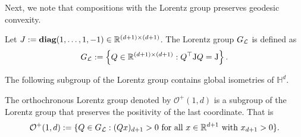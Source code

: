 \documentclass[twoside,11pt]{article}
\begin{document}
Next, we note that compositions with the Lorentz group preserves geodesic convexity.


\begin{definition}
Let $J := \textbf{diag}(1, \ldots, 1, -1) \in \mathbb{R}^{(d+1) \times (d+1)}$. The Lorentz group $G_{\mathcal{L}}$ is defined as 
\[
G_{\mathcal{L}}:=\left\{Q \in \mathbb{R}^{(d+1) \times(d+1)}: Q^{\top} \mathrm{J} Q=\mathrm{J}\right\} .
\]
\end{definition}


The following subgroup of the Lorentz group contains global isometries of $\mathbb{H}^d$.

\begin{definition}
The orthochronous Lorentz group denoted by $\mathcal{O}^+(1,d)$ is a subgroup of the Lorentz group that preserves the positivity of the last coordinate. That is 
\[
\mathcal{O}^+(1,d) := \{Q \in G_{\mathcal{L}}: (Qx)_{d+1} > 0 \text{ for all } x \in \mathbb{R}^{d+1} \text{ with } x_{d+1} > 0\}.
\]
\end{definition}
\end{document}
